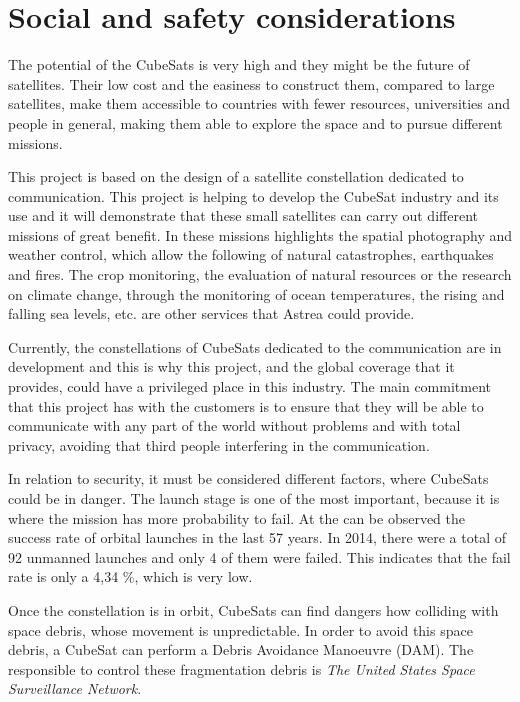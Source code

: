 \chapter{Social and safety considerations}
The potential of the CubeSats is very high and they might be the future of satellites. Their low cost and the easiness to construct them, compared to large satellites, make them accessible to countries with fewer resources, universities and people in general, making them able to explore the space and to pursue different missions.

This project is based on the design of a satellite constellation dedicated to communication. This project is helping to develop the CubeSat industry and its use and it will demonstrate that these small satellites can carry out different missions of great benefit. In these missions highlights the spatial photography and weather control, which allow the following of natural catastrophes, earthquakes and fires. The crop monitoring, the evaluation of natural resources or the research on climate change, through the monitoring of ocean temperatures, the rising and falling sea levels, etc. are other services that Astrea could provide. 

Currently, the constellations of CubeSats dedicated to the communication are in development and this is why this project, and the global coverage that it provides, could have a privileged place in this industry. The main commitment that this project has with the customers is to ensure that they will be able to communicate with any part of the world without problems and with total privacy, avoiding that third people interfering in the communication.

In relation to security, it must be considered different factors, where CubeSats could be in danger. The launch stage is one of the most important, because it is where the mission has more probability to fail. At the \cite[Chapter 4]{annex5} can be observed the success rate of orbital launches in the last 57 years. In 2014, there were a total of 92 unmanned launches and only 4 of them were failed. This indicates that the fail rate is only a 4,34 \%, which is very low. 

Once the constellation is in orbit, CubeSats can find dangers how colliding with space debris, whose movement is unpredictable. In order to avoid this space debris, a CubeSat can perform a Debris Avoidance Manoeuvre (DAM). The responsible to control these fragmentation debris is \textit{The United States Space Surveillance Network}.